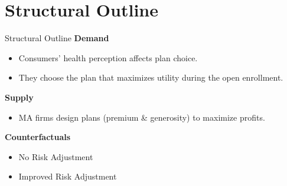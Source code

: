 \section{Structural Outline}
\label{sec:structural_model_summary}

\begin{frame}{Structural Outline}
    \textbf{Demand}
    \begin{itemize}
        \item Consumers' health perception affects plan choice.
        \item They choose the plan that maximizes utility during the open enrollment. \\ 
        \href{https://medicare65quote.com/advantage-plans/ny/suffolk-county/plans?zipcode=11790}{}
    \end{itemize}

    \vfill

    \pause

    \textbf{Supply}
    \begin{itemize}
        \item MA firms design plans (premium \& generosity) to maximize profits. 
    \end{itemize}

    \vfill

    \pause

    \textbf{Counterfactuals}
    \begin{itemize}
        \item No Risk Adjustment
        \item Improved Risk Adjustment
    \end{itemize}
\end{frame}
